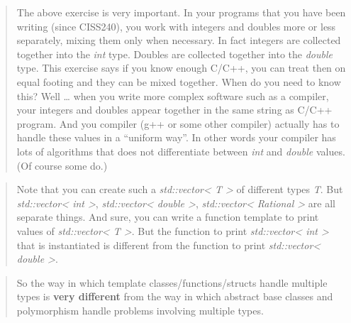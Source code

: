 \documentclass[
]{article}
\begin{document}
\begin{quote}
The above exercise is very important. In your programs that you have
been writing (since CISS240), you work with integers and doubles more or
less separately, mixing them only when necessary. In fact integers are
collected together into the \emph{int} type. Doubles are collected
together into the \emph{double} type. This exercise says if you know
enough C/C++, you can treat then on equal footing and they can be mixed
together. When do you need to know this? Well \ldots{} when you write
more complex software such as a compiler, your integers and doubles
appear together in the same string as C/C++ program. And you compiler
(g++ or some other compiler) actually has to handle these values in a
``uniform way''. In other words your compiler has lots of algorithms
that does not differentiate between \emph{int} and \emph{double} values.
(Of course some do.)
\end{quote}

\begin{quote}
\end{quote}

\begin{quote}
Note that you can create such a \emph{std::vector\textless{} T
\textgreater{}} of different types \emph{T}. But
\emph{std::vector\textless{} int \textgreater{}},
\emph{std::vector\textless{} double \textgreater{}},
\emph{std::vector\textless{} Rational \textgreater{}} are all separate
things. And sure, you can write a function template to print values of
\emph{std::vector\textless{} T \textgreater{}}. But the function to
print \emph{std::vector\textless{} int \textgreater{}} that is
instantiated is different from the function to print
\emph{std::vector\textless{} double \textgreater{}}.
\end{quote}

\begin{quote}
\end{quote}

\begin{quote}
So the way in which template classes/functions/structs handle multiple
types is \textbf{very different} from the way in which abstract base
classes and polymorphism handle problems involving multiple types.
\end{quote}

\begin{quote}
\end{quote}

\begin{quote}
\end{quote}
\end{document}
